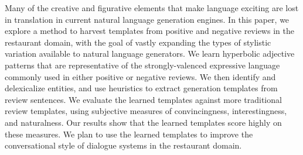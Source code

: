 Many of the creative and figurative elements that make language exciting are lost in translation in current natural language generation engines. In this paper, we explore a method to harvest templates from positive and negative reviews in the restaurant domain, with the goal of vastly expanding the types of stylistic variation available to natural language generators. We learn hyperbolic adjective patterns that are representative of the strongly-valenced expressive language commonly used in either positive or negative reviews.  We then identify and delexicalize entities, and use heuristics to extract generation templates from review sentences. We evaluate the learned templates against more traditional review templates, using subjective measures of convincingness, interestingness, and naturalness. Our results show that the learned templates score highly on these measures. We plan to use the learned templates to improve the conversational style of dialogue systems in the restaurant domain.

